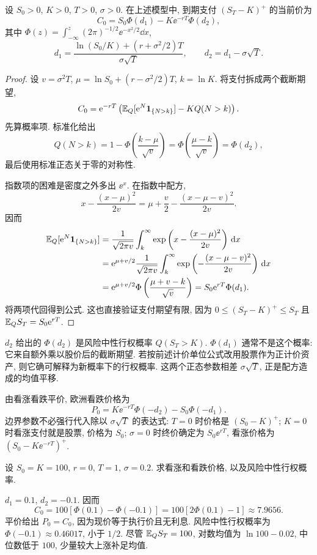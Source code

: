 \begin{theorem}[欧洲看涨期权公式]
设 $S_0>0$, $K>0$, $T>0$, $\sigma>0$. 在上述模型中, 到期支付 $(S_T-K)^+$ 的当前价为
\[
 C_0=S_0\Phi(d_1)-K\ee^{-rT}\Phi(d_2),
\]
其中 $\Phi(z)=\int_{-\infty}^z(2\pi)^{-1/2}\ee^{-x^2/2}\dd x$,
\[
 d_1=\frac{\ln(S_0/K)+(r+\sigma^2/2)T}{\sigma\sqrt T},
 \qquad d_2=d_1-\sigma\sqrt T.
\]
\end{theorem}
\begin{proof}
设 $v=\sigma^2T$, $\mu=\ln S_0+(r-\sigma^2/2)T$, $k=\ln K$. 将支付拆成两个截断期望,
\[
 C_0=\mathrm e^{-rT}\left(\mathbb E_Q[\mathrm e^N\mathbf 1_{\{N>k\}}]
                 -KQ(N>k)\right).
\]
先算概率项. 标准化给出
\[
 Q(N>k)=1-\Phi\left(\frac{k-\mu}{\sqrt v}\right)
 =\Phi\left(\frac{\mu-k}{\sqrt v}\right)=\Phi(d_2),
\]
最后使用标准正态关于零的对称性.

指数项的困难是密度之外多出 $\ee^x$. 在指数中配方,
\[
 x-\frac{(x-\mu)^2}{2v}
 =\mu+\frac v2-\frac{(x-\mu-v)^2}{2v}.
\]
因而
\begin{align*}
 \mathbb E_Q[\mathrm e^N\mathbf 1_{\{N>k\}}]
 &=\frac1{\sqrt{2\pi v}}\int_k^\infty
   \exp\left(x-\frac{(x-\mu)^2}{2v}\right)\,\mathrm d x\\
 &=\mathrm e^{\mu+v/2}\frac1{\sqrt{2\pi v}}\int_k^\infty
   \exp\left(-\frac{(x-\mu-v)^2}{2v}\right)\,\mathrm d x\\
 &=\mathrm e^{\mu+v/2}\Phi\left(\frac{\mu+v-k}{\sqrt v}\right)
 =S_0\mathrm e^{rT}\Phi(d_1).
\end{align*}
将两项代回得到公式. 这也直接验证支付期望有限, 因为 $0\leq(S_T-K)^+\leq S_T$ 且 $\mathbb E_QS_T=S_0\mathrm e^{rT}$.
\end{proof}
$d_2$ 给出的 $\Phi(d_2)$ 是风险中性行权概率 $Q(S_T>K)$.
$\Phi(d_1)$ 通常不是这个概率: 它来自额外乘以股价后的截断期望. 若按前述计价单位公式改用股票作为正计价资产, 则它确可解释为新概率下的行权概率. 这两个正态参数相差 $\sigma\sqrt T$, 正是配方造成的均值平移.

由看涨看跌平价, 欧洲看跌价格为
\[
 P_0=K\ee^{-rT}\Phi(-d_2)-S_0\Phi(-d_1).
\]
边界参数不必强行代入除以 $\sigma\sqrt T$ 的表达式: $T=0$ 时价格是 $(S_0-K)^+$; $K=0$ 时看涨支付就是股票, 价格为 $S_0$; $\sigma=0$ 时终价确定为 $S_0\ee^{rT}$, 看涨价格为 $(S_0-K\ee^{-rT})^+$.

\begin{example}
设 $S_0=K=100$, $r=0$, $T=1$, $\sigma=0.2$. 求看涨和看跌价格, 以及风险中性行权概率.
\end{example}
\begin{solution}
$d_1=0.1$, $d_2=-0.1$. 因而
\[
 C_0=100[\Phi(0.1)-\Phi(-0.1)]
 =100[2\Phi(0.1)-1]\approx7.9656.
\]
平价给出 $P_0=C_0$, 因为现价等于执行价且无利息. 风险中性行权概率为
$\Phi(-0.1)\approx0.46017$, 小于 $1/2$. 尽管 $\mathbb E_QS_T=100$, 对数均值为 $\ln100-0.02$, 中位数低于 $100$, 少量较大上涨补足均值.
\end{solution}

